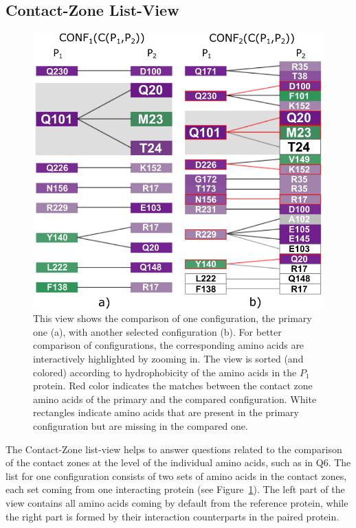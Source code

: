 \documentclass[twocolumn]{bmcart}%
\def\CoZoListView {Contact-Zone list-view\xspace}
\begin{document}
\subsection*{Contact-Zone List-View}
\begin{figure}[tb]
    \centering
    \includegraphics[width=0.95\columnwidth]{images/figure7.pdf}
   \caption{\csentence{\CoZoListView.} This view shows the comparison of one configuration, the primary one (a), with another selected configuration (b). For better comparison of configurations, the corresponding amino acids are interactively highlighted by zooming in. The view is sorted (and colored) according to hydrophobicity of the amino acids in the $P_1$ protein. Red color indicates the matches between the contact zone amino acids of the primary and the compared configuration. White rectangles indicate amino acids that are present in the primary configuration but are missing in the compared one.}
  \label{fig:list}
\end{figure}
The \CoZoListView helps to answer questions related to the comparison of the contact zones at the level of the individual amino acids, such as in Q6.
The list for one configuration consists of two sets of amino acids in the contact zones, each set coming from one interacting protein (see Figure~\ref{fig:list}).
The left part of the view contains all amino acids coming by default from the reference protein, while the right part is formed by their interaction counterparts in the paired protein.
\end{document}
